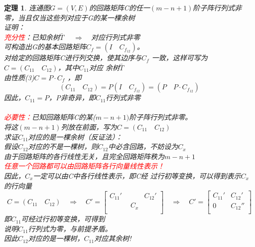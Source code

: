 \documentclass[11pt,a4paper,openany]{book}
\newcommand{\hwxw}{\CJKfamily{hwxw}}
\newcommand{\song}{\CJKfamily{song}}
\newtheorem{theorem}{\textbf{定理}}[section]
\begin{document}
\begin{theorem}
连通图$G=(V,E)$的回路矩阵C的任一$(m-n+1)$阶子阵行列式非零，当且仅当这些列对应于G的某一棵余树\\
{\song
证明：\\
\textcolor{red}{充分性}：已知余树$\bar{T}$ $\quad \Rightarrow \quad $对应行列式非零\\
可构造出G的基本回路矩阵$C_f=(I \quad C_{f_{12}})$。\\
 对给定的回路矩阵C进行列交换，使其边序与$C_f$
一致，这样可写为$C=(C_{11} \quad C_{12})$，其中$C_{11}$对应
余树$\bar{T}$\\
由性质(3)$C=P\cdot C_f$ ，即$$ (C_{11} \quad C_{12})=P(I \quad C_{f_{12}})=(P \quad P\cdot C_{f_{12}})$$
因此，$C_{11}=P$，P非奇异，即$C_{11}$行列式非零\\
\\
\textcolor{red}{必要性：}已知回路矩阵C的某($m-n+1)$阶子阵行列式非零。\\
将这$(m-n+1)$列放在前面，写为$C=(C_{11} \quad C_{12})$\\
求证$C_{11}$对应的是一棵余树（反证法）：\\
假设$C_{12}$对应的不是一棵树，则$C_{12}$中必含回路，不妨设为$C_x$\\
由于回路矩阵的各行线性无关，且完全回路矩阵秩为$m-n+1$\\
{\hwxw \textcolor{red}{任意一个回路都可以由回路矩阵各行向量线性表示！}}\\
因此，$C_x$一定可以由C中各行线性表示，即C经
过行初等变换，可以得到表示$C_x$的行向量
\begin{equation*}
  C=(C_{11}\quad C_{12}) \quad \Rightarrow \quad C'=\left[
                                                      \begin{array}{cc}
                                                        C_{11}' & C_{12}' \\
                                                       \qquad  \quad C_x \\
                                                      \end{array}
                                                    \right]\quad \Rightarrow \quad
                                                    C'=\left[
                                                      \begin{array}{cc}
                                                        C_{11}' & C_{12}' \\
                                                        0 & C_{12}'' \\
                                                      \end{array}
                                                    \right]
\end{equation*}
即$C_{11}$可经过行初等变换，可得到\\
说明$C_{11}$行列式为零，与前提矛盾。\\
因此$C_{12}$对应的是一棵树，$C_{11}$对应其余树!\\
}
\end{theorem}
\end{document}
